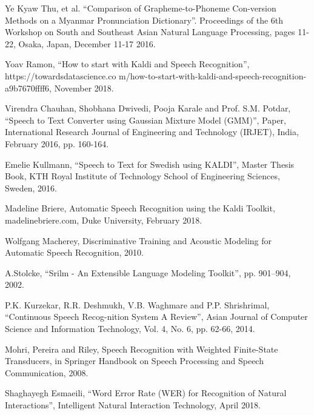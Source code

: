 \documentclass[conference]{IEEEtran}
\newcommand{\quotes}[1]{``#1''}
\begin{document}
\begin{thebibliography}{00}

Ye Kyaw Thu, et al. \quotes{Comparison of Grapheme-to-Phoneme Con-version Methods on a Myanmar Pronunciation Dictionary}. Proceedings of the 6th Workshop on South and Southeast Asian Natural Language Processing, pages 11-22, Osaka, Japan, December 11-17 2016.

Yoav Ramon, \quotes{How to start with Kaldi and Speech Recognition}, https://towardsdatascience.co m/how-to-start-with-kaldi-and-speech-recognition-a9b7670ffff6, November 2018.

Virendra Chauhan, Shobhana Dwivedi, Pooja
Karale and Prof. S.M. Potdar, \quotes{Speech to Text Converter using Gaussian Mixture Model (GMM)}, Paper, International Research Journal of Engineering and Technology (IRJET), India, February 2016, pp. 160-164.

Emelie Kullmann, \quotes{Speech to Text for Swedish
using KALDI}, Master Thesis Book, KTH Royal Institute of Technology School of Engineering Sciences, Sweden, 2016.

Madeline Briere, Automatic Speech Recognition
using the Kaldi Toolkit, madelinebriere.com, Duke
University, February 2018.

Wolfgang Macherey, Discriminative Training and Acoustic Modeling for Automatic Speech Recognition, 2010.

A.Stolcke, \quotes{Srilm - An Extensible Language Modeling Toolkit}, pp. 901–904, 2002.

P.K. Kurzekar, R.R. Deshmukh, V.B. Waghmare and P.P. Shrishrimal, \quotes{Continuous Speech Recog-nition System A Review}, Asian Journal of Computer Science and Information Technology, Vol. 4, No. 6, pp. 62-66, 2014.

Mohri, Pereira and Riley, Speech Recognition with Weighted Finite-State Transducers, in Springer Handbook on Speech Processing and Speech Communication, 2008.

Shaghayegh Esmaeili, \quotes{Word Error Rate (WER) for Recognition of Natural Interactions}, Intelligent Natural Interaction Technology, April 2018.





\end{thebibliography}
\end{document}
